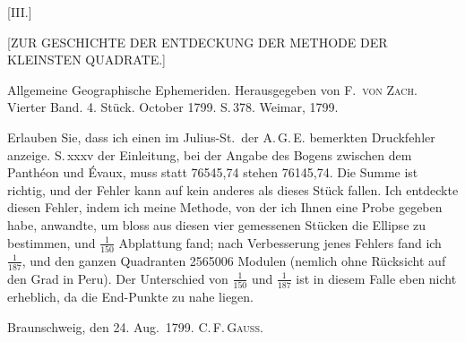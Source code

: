 \clearpage
{}
\begin{center}
[III.]

{[ZUR GESCHICHTE DER ENTDECKUNG DER METHODE DER\\
KLEINSTEN QUADRATE.]}
\end{center}

\begin{center}
Allgemeine Geographische Ephemeriden. Herausgegeben von F.\ \textsc{von Zach}.\\
Vierter Band. 4. Stück. October 1799. S.\,378. Weimar, 1799.
\end{center}

Erlauben Sie, dass ich einen im Julius-St.\ der A.\,G.\,E. bemerkten Druckfehler anzeige. S.\,xxxv der Einleitung, bei der Angabe des Bogens zwischen dem Panthéon und Évaux, muss statt 76545,74 stehen 76145,74. Die Summe ist richtig, und der Fehler kann auf kein anderes als dieses Stück fallen. Ich entdeckte diesen Fehler, indem ich meine Methode, von der ich Ihnen eine Probe gegeben habe, anwandte, um bloss aus diesen vier gemessenen Stücken die Ellipse zu bestimmen, und $\frac{1}{150}$ Abplattung fand; nach Verbesserung jenes Fehlers fand ich $\frac{1}{187}$, und den ganzen Quadranten 2565006 Modulen (nemlich ohne Rücksicht auf den Grad in Peru). Der Unterschied von $\frac{1}{150}$ und $\frac{1}{187}$ ist in diesem Falle eben nicht erheblich, da die End-Punkte zu nahe liegen.

\bigskip
\noindent Braunschweig, den 24. Aug.\ 1799. \hfill C.\,F.\,\textsc{Gauss}.

